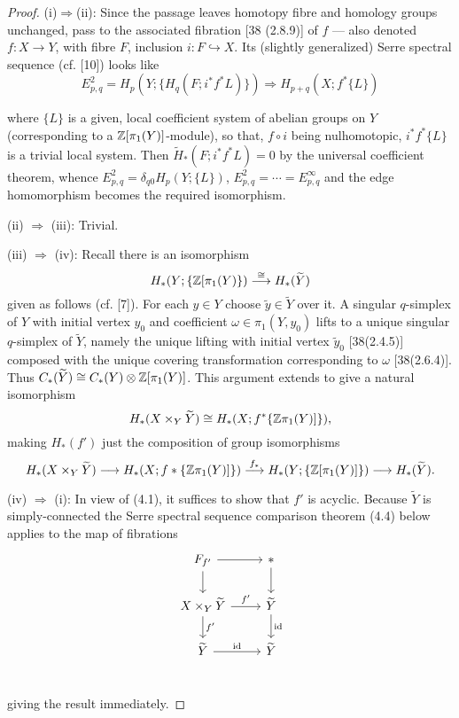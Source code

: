 \begin{proof}
(i)$\Rightarrow$(ii): Since the passage leaves homotopy fibre and homology groups unchanged, pass to the associated fibration [38 (2.8.9)] of $f$ --- also denoted $f\colon   X \longrightarrow Y$, with fibre $F$, inclusion $i\colon   F\hookrightarrow X$. Its (slightly generalized) Serre spectral sequence (cf. [10]) looks like
\[E_{p,q}^2 = H_p(Y;\{H_q(F;i^*f^*L)\}) \Longrightarrow  H_{p+q}(X;f^*\{L\})\]

where $\{L\}$ is a given, local coefficient system of abelian groups on $Y$ (corresponding to a $\mathbb{Z}[\pi_1(Y)]$-module), so that, $f\circ i$ being nulhomotopic, $i^*f^*\{L\}$ is a trivial local system. Then $\widetilde{H}_*(F; i^*f^*L) = 0$ by the universal coefficient theorem, whence $E^2_{p,q} = \delta_{q0} H_p(Y;\{L\})$,
$E^2_{p,q} = \cdots = E^{\infty}_{p,q}$ and the edge homomorphism becomes the required isomorphism.

(ii) $\Rightarrow$ (iii): Trivial.

(iii) $\Rightarrow$ (iv): Recall there is an isomorphism
\[H_*(Y;\{\mathbb{Z}[\pi_1(Y)\}) \overset{\cong}{\longrightarrow} H_*(\widetilde{Y})\]
given as follows (cf. [7]). For each $y\in Y$ choose $\widetilde{y}\in \widetilde{Y}$ over it. A singular $q$-simplex of $Y$ with initial vertex $y_0$ and coefficient $\omega \in \pi_1(Y,y_0)$ lifts to a unique singular $q$-simplex of $\widetilde{Y}$, namely the unique lifting with initial vertex $\widetilde{y}_0$ [38(2.4.5)] composed with the unique covering transformation corresponding to $\omega$ [38(2.6.4)]. Thus $C_*(\widetilde{Y}) \cong C_*(Y)\otimes \mathbb{Z}[\pi_1(Y)]$. This argument extends to give a natural isomorphism
\[H_*(X\times_Y \widetilde{Y}) \cong H_*(X;f^*\{\mathbb{Z}\pi_1(Y)]\}),\]
 making $H_*(f')$ just the composition of group isomorphisms
\[H_*(X\times_Y \widetilde{Y}) \longrightarrow H_*(X;f*\{\mathbb{Z} \pi_1(Y)]\})\overset{f_*}\longrightarrow  H_*(Y;\{\mathbb{Z}[\pi_1(Y)]\}) \longrightarrow H_*(\widetilde{Y}).\]

(iv) $\Rightarrow$ (i): In view of (4.1), it suffices to show that $f'$ is acyclic. Because $\widetilde{Y}$ is simply-connected the Serre spectral sequence comparison theorem (4.4) below applies to the map of fibrations
\[\begin{tikzcd}
F_{f'} \arrow{r} \arrow{d} & * \arrow{d}\\
X\times_Y \widetilde{Y} \arrow{r}{f'} \arrow{d}{f'}& \widetilde{Y} \arrow{d}{\id}\\
\widetilde{Y} \arrow{r}{\id} &\widetilde{Y}\\
\end{tikzcd}\]

giving the result immediately.
\end{proof}

